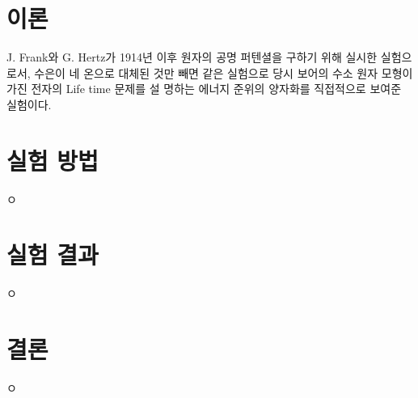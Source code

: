 \documentclass[a4paper, 10pt, nanum]{CSUniSchoolLabReport}
\begin{document}
\section{이론}

  J. Frank와 G. Hertz가 1914년 이후 원자의 공명
퍼텐셜을 구하기 위해 실시한 실험으로서, 수은이 네
온으로 대체된 것만 빼면 같은 실험으로 당시 보어의
수소 원자 모형이 가진 전자의 Life time 문제를 설
명하는 에너지 준위의 양자화를 직접적으로 보여준
실험이다.


\section{실험 방법}

	ㅇ


\section{실험 결과}

	ㅇ



\section{결론}

	ㅇ



\end{document}
